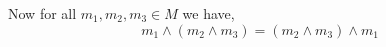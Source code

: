 Now for all $m_1,m_2,m_3 \in M$ we have,
    \[m_1\wedge (m_2 \wedge m_3) = (m_2 \wedge m_3) \wedge m_1\]